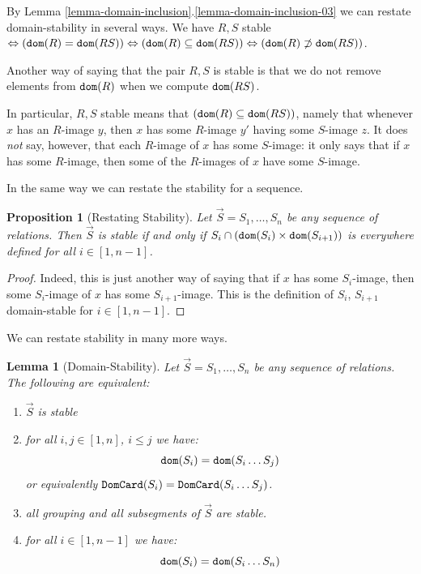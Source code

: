 \documentclass{lmcs}
\newtheorem{lemma}[theorem]{Lemma}
\newtheorem{proposition}[theorem]{Proposition}
\begin{document}
By Lemma \ref{lemma-domain-inclusion}.\ref{lemma-domain-inclusion-03} we can
restate domain-stability in several ways. We have
$R,S$ stable $ \Leftrightarrow ({\tt dom}(R) = {\tt dom}(RS))  
  \Leftrightarrow  
({\tt dom}(R) \subseteq {\tt dom}(RS)) 
  \Leftrightarrow   
({\tt dom}(R) \not \supset  {\tt dom}(RS))
$.

Another way of saying that the pair $R,S$ is stable is that we do not remove elements
from ${\tt dom}(R)$ when we compute ${\tt dom}(RS)$.

In particular, $R,S$ stable means that $({\tt dom}(R) \subseteq {\tt dom}(RS))$, 
namely that whenever $x$ has an $R$-image $y$, then $x$ has some
$R$-image $y'$ having some $S$-image $z$. It does \emph{not} say, however,
that each $R$-image of $x$ has some $S$-image: it only says that if $x$ has some
$R$-image, then some of the $R$-images of $x$ have some $S$-image. 

In the same way we can restate the stability for a sequence.

\begin{proposition}[Restating Stability]
Let $\vec{S}=S_1, \ldots, S_n$ be any sequence of relations. 
Then  $\vec{S}$ is stable if and only if $S_i \cap ({\tt dom}(S_i) \times {\tt dom}(S_{i+1}))$ 
is everywhere defined for all $i \in [1,n-1]$. 
\end{proposition}

\begin{proof}
Indeed, this is just another way of saying that if $x$ has some $S_i$-image,
then some $S_i$-image of $x$ has some $S_{i+1}$-image. This is the definition
of $S_i$, $S_{i+1}$ domain-stable for $i \in [1,n-1]$. 
\end{proof}

We can restate stability in many more ways.





\begin{lemma}[Domain-Stability]
\label{lemma-domain-stability}
Let $\vec{S}=S_1, \ldots, S_n$ be any sequence of relations. The following are equivalent:

\begin{enumerate}
\item
\label{lemma-domain-stability-01}
$\vec{S}$ is stable

\item
\label{lemma-domain-stability-02}
for all $i, j \in [1, n]$, $i \le j$ we have:
$$
{\tt dom}(S_i) =  {\tt dom}(S_i \ldots S_j)
$$
or equivalently ${\tt DomCard}(S_i) =  {\tt DomCard}(S_i \ldots S_j)$.

\item
\label{lemma-domain-stability-03}
all grouping and all subsegments of $\vec{S}$ are stable.

\item 
\label{lemma-domain-stability-04}
for all $i \in [1,n-1]$ we have:
$$
{\tt dom}(S_i) = {\tt dom}(S_i \ldots S_n)
$$

\end{enumerate}
\end{lemma}
\end{document}
